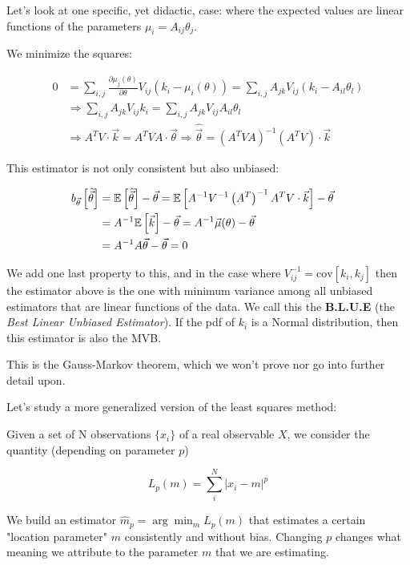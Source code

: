 \begin{example}
	Let's look at one specific, yet didactic, case: where the expected values are linear functions of the parameters $\mu_i = A_{ij}\theta_j$.
	
	We minimize the squares:
	
	\begin{align*}
		0 &= \sum_{i,j} \frac{\partial \mu_j(\theta)}{\partial\theta}V_{ij}\left(k_i - \mu_i(\theta)\right) = \sum_{i,j} A_{jk} V_{ij}\left(k_i - A_{il}\theta_l\right) \\
		&\Rightarrow \sum_{i,j} A_{jk} V_{ij}k_i = \sum_{i,j} A_{jk} V_{ij}A_{il}\theta_l \\
		&\Rightarrow A^T V\cdot \vec{k} = A^T VA\cdot\vec{\theta}\Rightarrow \hat{\vec{\theta}} = \left(A^T VA\right)^{-1}\left(A^TV\right)\cdot\vec{k}
	\end{align*}
	
	This estimator is not only consistent but also unbiased:
	
	\begin{align*}
		b_{\vec\theta}\left[\hat{\vec{\theta}}\right] &= \mathbb{E}\left[\hat{\vec{\theta}}\right] - \vec\theta = \mathbb{E}\left[A^{-1}V^{-1}\left(A^T\right)^{-1}A^TV\cdot \vec{k}\right] - \vec\theta \\
		&= A^{-1}\mathbb{E}\left[\vec{k}\right] - \vec\theta =  A^{-1}\vec{\mu}(\theta) - \vec\theta &\\
		&=A^{-1}A\vec{\theta} - \vec\theta = 0 
	\end{align*}
	
	We add one last property to this, and in the case where $V_{ij}^{-1} = \text{cov}\left[k_i,k_j\right]$ then the estimator above is the one with minimum variance among all unbiased estimators that are linear functions of the data. We call this the \textbf{B.L.U.E} (the \emph{Best Linear Unbiased Estimator}). If the pdf of $k_i$ is a Normal distribution, then this estimator is also the MVB. 
	
	This is the Gauss-Markov theorem, which we won't prove nor go into further detail upon. 
\end{example}

Let's study a more generalized version of the least squares method:
\begin{definition}
Given a set of N observations $\{x_i\}$ of a real observable $X$, we consider the quantity (depending on parameter $p$)
	
	\[
	L_p(m) = \sum_i^N \left|x_i - m\right|^p
	\]
	
We build an estimator $\hat{m}_p=\arg\min_m L_p(m)$ that estimates a certain "location parameter" $m$ consistently and without bias. Changing $p$ changes what meaning we attribute to the parameter $m$ that we are estimating.
\end{definition}

